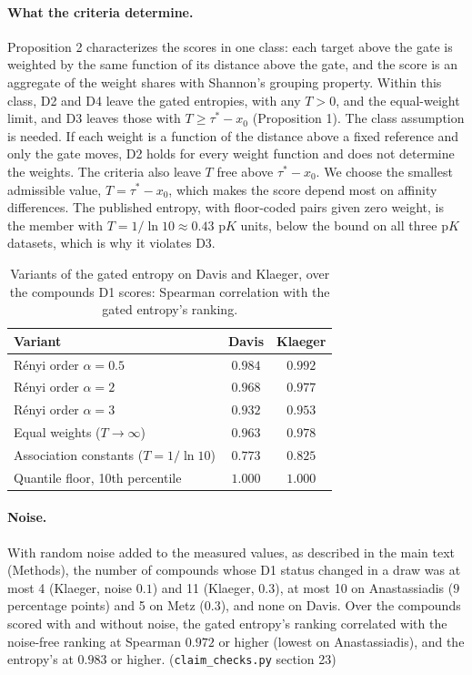 \documentclass[11pt]{article}
\begin{document}
\paragraph{What the criteria determine.} Proposition 2 characterizes the scores in one class:
each target above the gate is weighted by the same function of its distance
above the gate, and the score is an aggregate of the weight shares with
Shannon's grouping property. Within this class, D2 and D4 leave the gated
entropies, with any $T > 0$, and the equal-weight limit, and D3 leaves those
with $T \geq \tau^* - x_0$ (Proposition 1). The class assumption is needed. If
each weight is a function of the distance above a fixed reference and only the
gate moves, D2 holds for every weight function and does not determine the
weights. The criteria also leave $T$ free above
$\tau^* - x_0$. We choose the smallest admissible value, $T = \tau^* - x_0$,
which makes the score depend most on affinity differences.
The published entropy, with floor-coded pairs given zero weight, is the member
with $T = 1/\ln 10 \approx 0.43$ $\mathrm{p}K$ units, below the bound on all
three $\mathrm{p}K$ datasets, which is why it violates D3.

\begin{table}[h]
\centering
\caption{Variants of the gated entropy on Davis and Klaeger, over the
compounds D1 scores: Spearman correlation with the gated entropy's ranking.}
\small
\begin{tabular}{lcc}
\toprule
Variant & Davis & Klaeger \\
\midrule
R\'enyi order $\alpha = 0.5$ & $0.984$ & $0.992$ \\
R\'enyi order $\alpha = 2$   & $0.968$ & $0.977$ \\
R\'enyi order $\alpha = 3$   & $0.932$ & $0.953$ \\
Equal weights ($T \to \infty$) & $0.963$ & $0.978$ \\
Association constants ($T = 1/\ln 10$) & $0.773$ & $0.825$ \\
Quantile floor, 10th percentile & $1.000$ & $1.000$ \\
\bottomrule
\end{tabular}
\end{table}

\paragraph{Noise.} With random noise added to the measured values, as described
in the main text (Methods), the
number of compounds whose D1 status changed in a draw was at most 4 (Klaeger,
noise $0.1$) and 11 (Klaeger, $0.3$), at most 10 on Anastassiadis ($9$
percentage points) and 5 on Metz ($0.3$), and none on Davis. Over the compounds
scored with and without noise, the gated entropy's ranking correlated with the
noise-free ranking at Spearman $0.972$ or higher (lowest on Anastassiadis), and
the entropy's at $0.983$ or higher. (\texttt{claim\_checks.py} section 23)
\end{document}
